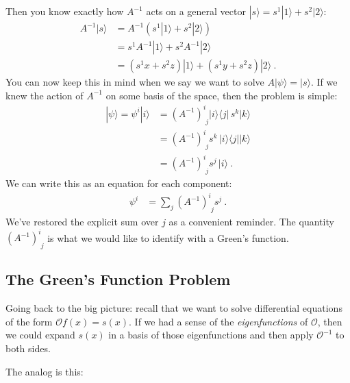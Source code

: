 Then you know exactly how $A^{-1}$ acts on a general vector $|s\rangle = s^1|1\rangle + s^2 |2\rangle$:
\begin{align}
  A^{-1} |s\rangle &=
  A^{-1} \left( s^1|1\rangle + s^2 |2\rangle \right)
  \\ 
  &=
  s^1 A^{-1} |1\rangle + s^2 A^{-1} |2\rangle
  \label{eq:Ainv:basis:action:on:gen:step2}
  \\
  &=
  (s^1x + s^2z)|1\rangle + (s^1y + s^2 z)|2\rangle \ .
  \label{eq:Ainv:basis:action:on:gen}
\end{align}
You can now keep this in mind when we say we want to solve $A|\psi\rangle = |s\rangle$. If we knew the action of $A^{-1}$ on some basis of the space, then the problem is simple:
\begin{align}
  |\psi\rangle = \psi^i |i\rangle 
  &= \left( A^{-1} \right)^i_{\phantom{i}j} |i\rangle\langle j|
  \, s^k|k\rangle 
  \\
  &= \left(A^{-1}\right)^i_{\phantom{i}j} s^k \, |i\rangle\langle j|
  |k\rangle 
  \\
  &=\left(A^{-1}\right)^i_{\phantom{i}j} s^j \, |i\rangle \ .
\end{align}
We can write this as an equation for each component:
\begin{align}
  \psi^i &= \sum_j \left(A^{-1}\right)^i_{\phantom{i}j} s^j
  \label{eq:Ainv:acting:on:source} \ .
\end{align}
We've restored the explicit sum over $j$ as a convenient reminder. The quantity $\left(A^{-1}\right)^i_{\phantom{i}j}$ is what we would like to identify with a Green's function.







\subsection{The Green’s Function Problem}

Going back to the big picture: recall that we want to solve differential equations of the form $\mathcal O f(x) = s(x)$. If we had a sense of the \emph{eigenfunctions} of $\mathcal O$, then we could expand $s(x)$ in a basis of those eigenfunctions and then apply $\mathcal O^{-1}$ to both sides. 

The analog is this:

